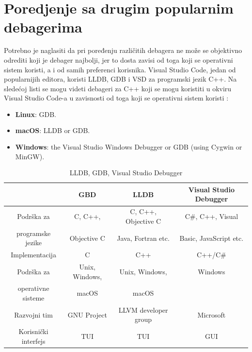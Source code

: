 \documentclass[a4paper]{article}
\begin{document}
\section{Poredjenje sa drugim popularnim debagerima}
\label{sec:naslovN}

Potrebno je naglasiti da pri poređenju različitih debagera ne može se objektivno odrediti koji je debager najbolji, jer to dosta zavisi od toga koji se operativni sistem koristi, a i od samih preferenci korisnika. Visual Studio Code, jedan od popularnijih editora, koristi LLDB, GDB i VSD za programski jezik C++. Na sledećoj listi se mogu videti debageri za C++ koji se mogu koristiti u okviru Visual Studio Code-a u zavisnosti od toga koji se operativni sistem koristi \cite{vsc_support}:
\begin{itemize}
	\item \textbf{Linux}: GDB.
	\item \textbf{macOS}: LLDB or GDB.
	\item \textbf{Windows}: the Visual Studio Windows Debugger or GDB (using Cygwin or MinGW).
\end{itemize}

\begin{table}[ht!]
	\begin{center}
		\caption{LLDB, GDB, Visual Studio Debugger \cite{gdb}\cite{lldb}\cite{vsd}}
		\label{table:tabela_poredjenje}
		\begin{footnotesize}
			\begin{tabular}{| c | c | c | c |}
				\hline
				& \cellcolor{red!60}GBD & \cellcolor{red!60}LLDB & \cellcolor{red!60}Visual Studio Debugger \\ 
				\hline
				\cellcolor{orange!60}Podrška za& \cellcolor{yellow!60}C, C++, & \cellcolor{yellow!60}C, C++, Objective C & \cellcolor{yellow!60}C\#, C++, Visual \\ 
				\cellcolor{orange!60}programske jezike & \cellcolor{yellow!60}Objective C & \cellcolor{yellow!60}Java, Fortran etc. & \cellcolor{yellow!60}Basic, JavaScript etc. \\ 
				\hline 
				\cellcolor{orange!60}Implementacija & \cellcolor{yellow!60}C & \cellcolor{yellow!60}C++ & \cellcolor{yellow!60}C++/C\# \\
				\hline
				\cellcolor{orange!60}Podrška za& \cellcolor{yellow!60}Unix, Windows,& \cellcolor{yellow!60}Unix, Windows,& \cellcolor{yellow!60}Windows\\
				\cellcolor{orange!60}operativne sisteme & \cellcolor{yellow!60}macOS & \cellcolor{yellow!60}macOS & \cellcolor{yellow!60}\\
				\hline
				\cellcolor{orange!60}Razvojni tim & \cellcolor{yellow!60}GNU Project & \cellcolor{yellow!60}LLVM developer group & \cellcolor{yellow!60}Microsoft \\
				\hline
				\cellcolor{orange!60}Korisnički interfejs & \cellcolor{yellow!60}TUI & \cellcolor{yellow!60}TUI & \cellcolor{yellow!60}GUI\\
				\hline
			\end{tabular}
		\end{footnotesize}
	\end{center}
\end{table}
\end{document}
